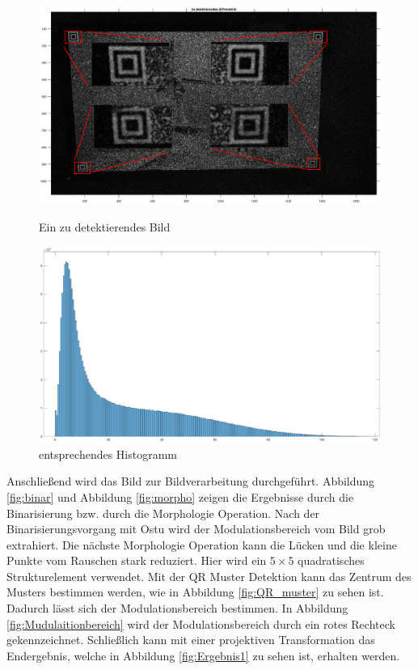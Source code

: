 \begin{figure}[H]
\centering 
\begin{minipage}[b]{0.49\textwidth} 
\centering 
\includegraphics[width=1.0\textwidth]{images/5_Implementirung/Diff/zudifferenzbild.eps} 
\caption{Ein zu detektierendes Bild}
\label{fig:nachdiff}
\end{minipage}
\begin{minipage}[b]{0.49\textwidth} 
\centering 
\includegraphics[width=1.0\textwidth]{images/5_Implementirung/Diff/histogramm.eps}
\caption{entsprechendes Histogramm}
\label{fig:Histogramm}
\end{minipage}
\end{figure}

Anschließend wird das Bild zur Bildverarbeitung durchgeführt. Abbildung \ref{fig:binar} und Abbildung \ref{fig:morpho} zeigen die Ergebnisse durch die Binarisierung bzw. durch die Morphologie Operation. Nach der Binarisierungsvorgang mit Ostu wird der Modulationsbereich vom Bild grob extrahiert. Die nächste Morphologie Operation kann die Lücken und die kleine Punkte vom Rauschen stark reduziert. Hier wird ein $ 5 \times 5 $ quadratisches Strukturelement verwendet. Mit der QR Muster Detektion kann das Zentrum des Musters bestimmen werden, wie in Abbildung \ref{fig:QR_muster} zu sehen ist. Dadurch lässt sich der Modulationsbereich bestimmen. In Abbildung \ref{fig:Mudulaitionbereich} wird der Modulationsbereich durch ein rotes Rechteck gekennzeichnet. Schließlich kann mit einer projektiven Transformation das Endergebnis, welche in Abbildung \ref{fig:Ergebnis1} zu sehen ist, erhalten werden.

